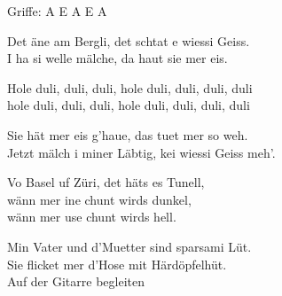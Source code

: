 \documentclass[
  letterpaper,
  a5paper]{memoir}
\begin{document}
Griffe: A E A E A

Det äne am Bergli, det schtat e wiessi Geiss.\\
I ha si welle mälche, da haut sie mer eis.

Hole duli, duli, duli, hole duli, duli, duli, duli\\
hole duli, duli, duli, hole duli, duli, duli, duli

Sie hät mer eis g'haue, das tuet mer so weh.\\
Jetzt mälch i miner Läbtig, kei wiessi Geiss meh'.

Vo Basel uf Züri, det häts es Tunell,\\
wänn mer ine chunt wirds dunkel,\\
wänn mer use chunt wirds hell.

Min Vater und d'Muetter sind sparsami Lüt.\\
Sie flicket mer d'Hose mit Härdöpfelhüt.\\
Auf der Gitarre begleiten


\backmatter
\end{document}
